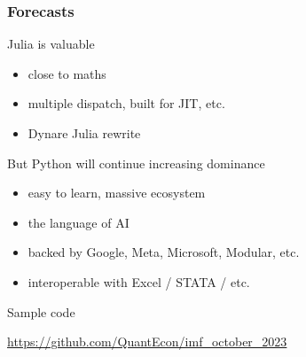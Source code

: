 \documentclass[
    xcolor={svgnames,dvipsnames},
    hyperref={colorlinks, citecolor=DeepPink4, linkcolor=DarkRed, urlcolor=DarkBlue}
    ]{beamer}  %
\newcommand{\1}{\mathbbm 1}
\begin{document}
\begin{frame}
    \frametitle{Forecasts}

    Julia is valuable
    \begin{itemize}
        \item close to maths
        \vspace{0.5em}
        \item multiple dispatch, built for JIT, etc.
        \vspace{0.5em}
        \item Dynare Julia rewrite
    \end{itemize}

    \pause

        \vspace{0.5em}
        \vspace{0.5em}
    But Python will continue increasing dominance

    \begin{itemize}
        \item easy to learn, massive ecosystem
        \vspace{0.5em}
        \item the language of AI
        \vspace{0.5em}
        \item backed by Google, Meta, Microsoft, Modular, etc.
        \vspace{0.5em}
        \item interoperable with Excel / STATA / etc.
    \end{itemize}


\end{frame}


\begin{frame}
    
    Sample code

    \url{https://github.com/QuantEcon/imf_october_2023}
\end{frame}
\end{document}
